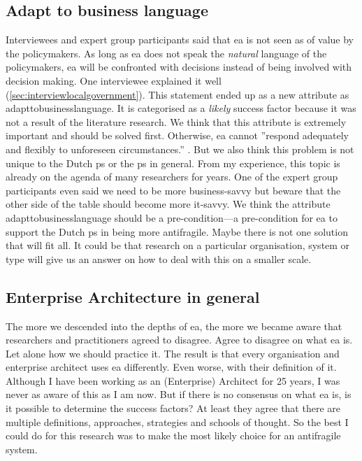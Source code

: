 \subsection{Adapt to business language}
\label{sub:adapttobusinesslanguage}
Interviewees and expert group participants said that \gls{ea} is not seen as of value by the policymakers. As long as \gls{ea} does not speak the \textit{natural} language of the policymakers, \gls{ea} will be confronted with decisions instead of being involved with decision making. One interviewee explained it well (\cref{sec:interviewlocalgovernment}). This statement ended up as a new \gls{attribute} as \gls{adapttobusinesslanguage}. It is categorised as a \textit{likely} success factor because it was not a result of the literature research. We think that this \gls{attribute} is extremely important and should be solved first. Otherwise, \gls{ea} cannot ''respond adequately and flexibly to unforeseen circumstances.'' \parencite{Secretarissen-generaal2018}. But we also think this problem is not unique to the Dutch \gls{ps} or the \gls{ps} in general. From my experience, this topic is already on the agenda of many researchers for years. One of the expert group participants even said we need to be more business-savvy but beware that the other side of the table should become more \acrlong{it}-savvy. We think the \gls{attribute} \gls{adapttobusinesslanguage} should be a pre-condition—a pre-condition for \gls{ea} to support the Dutch \gls{ps} in being more \gls{antifragile}. Maybe there is not one solution that will fit all. It could be that research on a particular organisation, system or type will give us an answer on how to deal with this on a smaller scale.

\subsection{Enterprise Architecture in general}
\label{sub:eainthepublicsector}
The more we descended into the depths of \gls{ea}, the more we became aware that researchers and practitioners agreed to disagree. Agree to disagree on what \gls{ea} is. Let alone how we should practice it. The result is that every organisation and enterprise architect uses \gls{ea} differently. Even worse, with their definition of it. Although I have been working as an (Enterprise) Architect for 25 years, I was never as aware of this as I am now. But if there is no consensus on what \gls{ea} is, is it possible to determine the success factors? At least they agree that there are multiple definitions, approaches, strategies and schools of thought. So the best I could do for this research was to make the most likely choice for an \gls{antifragile} system.

